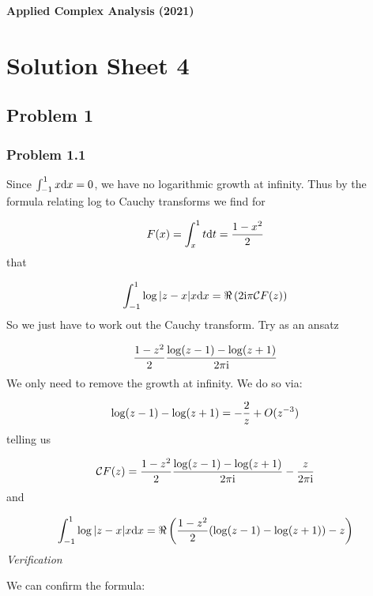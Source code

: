 \documentclass[12pt,a4paper]{article}
\def\D{ {\rm d} }
\def\I{ {\rm i} }
\def\CC{ {\cal C} }
\def\dx{\D x}
\def\dt{\D t}
\def\pr(#1){\left({#1}\right)}
\begin{document}
\textbf{Applied Complex Analysis (2021)}

\section{Solution Sheet 4}
\subsection{Problem 1}
\subsubsection{Problem 1.1}
Since $\int_{-1}^1 x \dx = 0$, we have no logarithmic growth at infinity. Thus by the formula relating log to Cauchy transforms we find for

\[
F(x) = \int_x^1 t \dt = {1 - x^2 \over 2}
\]
that

\[
\int_{-1}^1 \log|z-x| x \dx = \Re\pr({2 \I \pi \CC F(z)})
\]
So we just have to work out the Cauchy transform. Try as an ansatz

\[
{1 - z^2 \over 2} {\log(z-1) - \log(z+1) \over 2 \pi \I}
\]
We only need to remove the growth at infinity. We do so via:

\[
\log(z-1) - \log(z+1)  = -{2 \over z} + O(z^{-3})
\]
telling us

\[
\CC F(z) = {1 - z^2 \over 2} {\log(z-1) - \log(z+1)  \over 2 \pi \I} - {z \over 2 \pi \I}
\]
and

\[
\int_{-1}^1 \log|z-x| x \dx = \Re \left({1 - z^2 \over 2} (\log(z-1) - \log(z+1)) - z \right)
\]
\emph{Verification}

We can confirm the formula:
\end{document}
